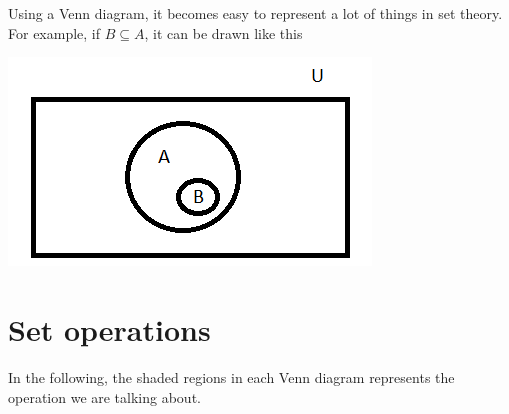 \documentclass[12pt]{article}
\begin{document}
Using a Venn diagram, it becomes easy to represent a lot of things in set theory. For example, if $B \subseteq A$, it can be drawn like this

\includegraphics{SubsetVenn.png}

\section*{Set operations}
In the following, the shaded regions in each Venn diagram represents the operation we are talking about.
\end{document}
